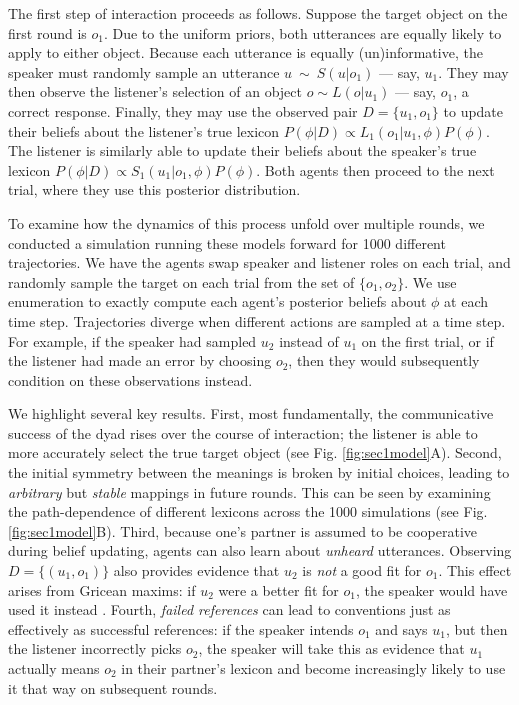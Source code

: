 The first step of interaction proceeds as follows.
Suppose the target object on the first round is $o_1$.
Due to the uniform priors, both utterances are equally likely to apply to either object. 
Because each utterance is equally (un)informative, the speaker must randomly sample an utterance $u~\sim~S(u|o_1)$ --- say, $u_1$.
They may then observe the listener's selection of an object $o \sim L(o | u_1)$ --- say, $o_1$, a correct response.
Finally, they may use the observed pair $D = \{u_1, o_1\}$ to update their beliefs about the listener's true lexicon $P(\phi | D)\propto L_1(o_1 | u_1, \phi)P(\phi)$.
The listener is similarly able to update their beliefs about the speaker's true lexicon $P(\phi | D)\propto S_1(u_1 | o_1, \phi)P(\phi)$. 
Both agents then proceed to the next trial, where they use this posterior distribution.

To examine how the dynamics of this process unfold over multiple rounds, we conducted a simulation running these models forward for 1000 different trajectories.
We have the agents swap speaker and listener roles on each trial, and randomly sample the target on each trial from the set of $\{o_1, o_2\}$.
We use enumeration to exactly compute each agent's posterior beliefs about $\phi$ at each time step.
Trajectories diverge when different actions are sampled at a time step.
For example, if the speaker had sampled $u_2$ instead of $u_1$ on the first trial, or if the listener had made an error by choosing $o_2$, then they would subsequently condition on these observations instead.

We highlight several key results.
First, most fundamentally, the communicative success of the dyad rises over the course of interaction; the listener is able to more accurately select the true target object (see Fig. \ref{fig:sec1model}A). 
Second, the initial symmetry between the meanings is broken by initial choices, leading to \emph{arbitrary} but \emph{stable} mappings in future rounds.
This can be seen by examining the path-dependence of different lexicons across the 1000 simulations (see Fig.\ref{fig:sec1model}B). 
Third, because one's partner is assumed to be cooperative during belief updating, agents can also learn about \emph{unheard} utterances. 
Observing $D = \{(u_1, o_1)\}$ also provides evidence that $u_2$ is \emph{not} a good fit for $o_1$.
This effect arises from Gricean maxims: if $u_2$ were a better fit for $o_1$, the speaker would have used it instead \cite{Grice75_LogicConversation}. 
Fourth, \emph{failed references} can lead to conventions just as effectively as successful references: if the speaker intends $o_1$ and says $u_1$, but then the listener incorrectly picks $o_2$, the speaker will take this as evidence that $u_1$ actually means $o_2$ in their partner's lexicon and become increasingly likely to use it that way on subsequent rounds.

